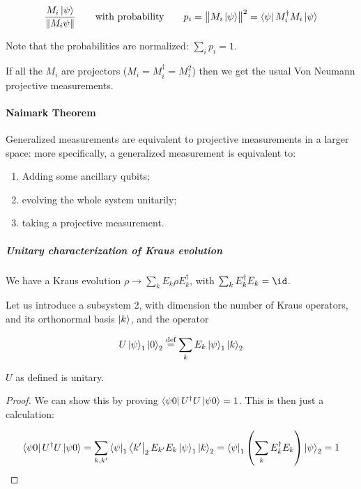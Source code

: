 \documentclass[main.tex]{subfiles}
\begin{document}
\begin{equation}
    \frac{M_i \ket{\psi}}{\norm{M_i \psi}}
    \qquad
    \text{with probability}
    \qquad
    p_i=
    \norm{M_i \ket{\psi}}^2
    = \bra{\psi} M_i ^\dag M_i \ket{\psi}
\end{equation}

Note that the probabilities are normalized: \(\sum _i p_i = 1\).

If all the \(M_i\) are projectors (\(M_i = M_i ^\dag = M^2_i\)) then we get the usual Von Neumann projective measurements.

\paragraph{Naimark Theorem}

Generalized measurements are equivalent to projective measurements in a larger space: more specifically, a generalized measurement is equivalent to:

\begin{enumerate}
    \item Adding some ancillary qubits;
    \item evolving the whole system unitarily;
    \item taking a projective measurement.
\end{enumerate}

\subparagraph{Unitary characterization of Kraus evolution}

We have a Kraus evolution \(\rho \rightarrow \sum _{k}  E_k \rho E_k ^\dag \), with \(\sum _{k}  E_k ^\dag E_k = \id \).

Let us introduce a subsystem 2, with dimension the number of Kraus operators, and its orthonormal basis \(\ket{k} \), and the operator

\begin{equation}
    U \ket{\psi}_1 \ket{0}_2 \stackrel{\text{def}}{=} \sum _{k}  E_k \ket{\psi}_1 \ket{k} _2
\end{equation}

\begin{claim}
\(U\) as defined is unitary.
\end{claim}

\begin{proof}
We can show this by proving \(\bra{\psi 0} U ^\dag U \ket{\psi 0} = 1  \).
This is then just a calculation:

\begin{equation}
    \bra{\psi 0} U ^\dag U \ket{\psi 0} =
    \sum _{k, k'} \bra{\psi}_1 \bra{k'}_2 E_{k'}
    E_k \ket{\psi}_1 \ket{k} _2
    = \bra{\psi}_1 \qty(\sum _{k}  E_k ^\dag E_k ) \ket{\psi}_2
    = 1
\end{equation}
\end{proof}
\end{document}
